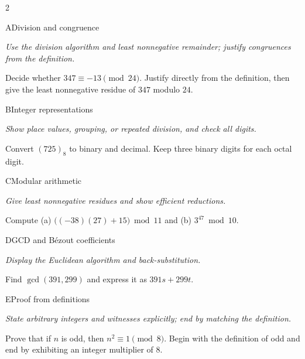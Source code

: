 \documentclass[9pt]{extarticle}
\begin{document}
\begin{multicols}{2}
\begin{CoreProblem}{A}{Division and congruence}
{\scriptsize\textit{Use the division algorithm and least nonnegative remainder; justify congruences from the definition.}\par}
Decide whether $347\equiv-13\pmod{24}$. Justify directly from the definition,
then give the least nonnegative residue of $347$ modulo $24$.
\end{CoreProblem}
\begin{CoreProblem}{B}{Integer representations}
{\scriptsize\textit{Show place values, grouping, or repeated division, and check all digits.}\par}
Convert $(725)_8$ to binary and decimal. Keep three binary digits for each
octal digit.
\end{CoreProblem}
\begin{CoreProblem}{C}{Modular arithmetic}
{\scriptsize\textit{Give least nonnegative residues and show efficient reductions.}\par}
Compute (a) $\bigl((-38)(27)+15\bigr)\bmod11$ and
(b) $3^{47}\bmod10$.
\end{CoreProblem}
\columnbreak
\begin{CoreProblem}{D}{GCD and B\'ezout coefficients}
{\scriptsize\textit{Display the Euclidean algorithm and back-substitution.}\par}
Find $\gcd(391,299)$ and express it as $391s+299t$.
\end{CoreProblem}
\begin{CoreProblem}{E}{Proof from definitions}
{\scriptsize\textit{State arbitrary integers and witnesses explicitly; end by matching the definition.}\par}
Prove that if $n$ is odd, then $n^2\equiv1\pmod{8}$. Begin with the definition
of odd and end by exhibiting an integer multiplier of $8$.
\end{CoreProblem}
\end{multicols}
\CoreWorkArea
\end{document}
